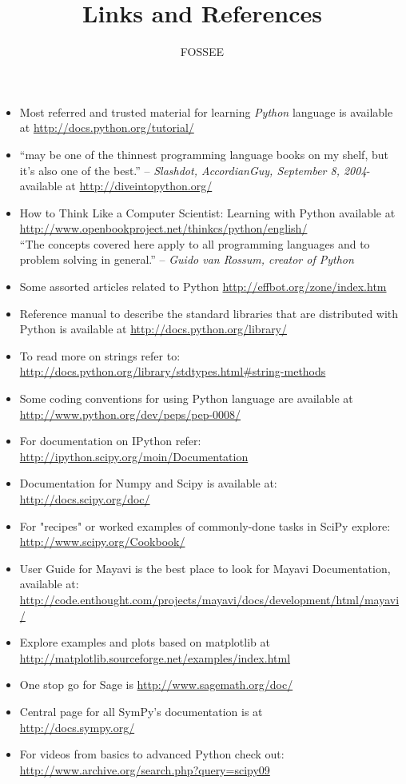 \documentclass[12pt]{article}
\title{Links and References}
\author{FOSSEE}
\date{}
\begin{document}
\maketitle
\begin{itemize}
  \item Most referred and trusted material for learning \emph{Python} language is available at \url{http://docs.python.org/tutorial/}
  \item ``may be one of the thinnest programming language books on my shelf, but it's also one of the best.'' -- \emph{Slashdot, AccordianGuy, September 8, 2004}- available at \url{http://diveintopython.org/}
  \item How to Think Like a Computer Scientist: Learning with Python available at \url{http://www.openbookproject.net/thinkcs/python/english/}\\``The concepts covered here apply to all programming languages and to problem solving in general.'' -- \emph{Guido van Rossum, creator of Python}
  \item Some assorted articles related to Python \url{http://effbot.org/zone/index.htm}
  \item Reference manual to describe the standard libraries  that are distributed with Python is available at \url{http://docs.python.org/library/} 
  \item To read more on strings refer to: \\ \url{http://docs.python.org/library/stdtypes.html#string-methods}
  \item Some coding conventions for using Python language are available at \\ \url{http://www.python.org/dev/peps/pep-0008/}
  \item For documentation on IPython refer: \\ \url{http://ipython.scipy.org/moin/Documentation}
  \item Documentation for Numpy and Scipy is available at: \url{http://docs.scipy.org/doc/}
  \item For "recipes" or worked examples of commonly-done tasks in SciPy explore: \url{http://www.scipy.org/Cookbook/}
  \item User Guide for Mayavi is the best place to look for Mayavi Documentation, available at: \\ \url{http://code.enthought.com/projects/mayavi/docs/development/html/mayavi/}
  \item Explore examples and plots based on matplotlib at \\ \url{http://matplotlib.sourceforge.net/examples/index.html}
  \item One stop go for Sage is \url{http://www.sagemath.org/doc/}
  \item Central page for all SymPy’s documentation is at \\ \url{http://docs.sympy.org/}
  \item For videos from basics to advanced Python check out: \\ \url{http://www.archive.org/search.php?query=scipy09}

\end{itemize}
\end{document}
